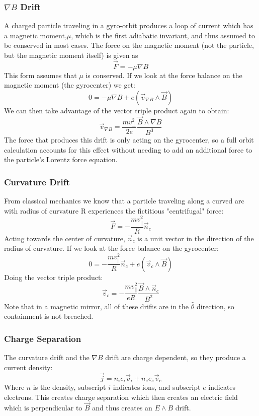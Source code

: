 \documentclass[12pt]{article}
\begin{document}
\subsubsection{$\nabla B$ Drift}
A charged particle traveling in a gyro-orbit produces a loop of current which has a magnetic moment,$\mu$, which is the first adiabatic invariant, and thus assumed to be conserved in most cases. The force on the magnetic moment (not the particle, but the magnetic moment itself) is given as
$$\vec{F}=-\mu\nabla B$$
This form assumes that $\mu$ is conserved. If we look at the force balance on the magnetic moment (the gyrocenter) we get:
$$0=-\mu\nabla B+e(\vec{v}_{\nabla B}\wedge\vec{B})$$
We can then take advantage of the vector triple product again to obtain:
\begin{equation}\label{gradB}
\vec{v}_{\nabla B}=\frac{mv_{\perp}^2}{2e}\frac{\vec{B}\wedge\nabla B}{B^3}
\end{equation}
The force that produces this drift is only acting on the gyrocenter, so a full orbit calculation accounts for this effect without needing to add an additional force to the particle's Lorentz force equation.
\subsubsection{Curvature Drift}
From classical mechanics we know that a particle traveling along a curved arc with radius of curvature R experiences the fictitious "centrifugal" force:
$$\vec{F}=-\frac{mv_{\parallel}^2}{R}\vec{n}_c$$
Acting towards the center of curvature, $\vec{n}_c$ is a unit vector in the direction of the radius of curvature. If we look at the force balance on the gyrocenter:
$$0=-\frac{mv_{\parallel}^2}{R}\vec{n}_c+e(\vec{v}_{c}\wedge\vec{B})$$
Doing the vector triple product:
\begin{equation}\label{Cuvature}
\vec{v}_c=-\frac{mv_{\parallel}^2}{eR}\frac{\vec{B}\wedge\vec{n}_c}{B^2}
\end{equation}
Note that in a magnetic mirror, all of these drifts are in the $\hat{\theta}$ direction, so containment is not breached.
\subsubsection{Charge Separation}
The curvature drift and the $\nabla B$ drift are charge dependent, so they produce a current density:
\begin{equation}\label{current}
\vec{j}=n_ie_i\vec{v}_i+n_ee_e\vec{v}_e
\end{equation}
Where $n$ is the density, subscript $i$ indicates ions, and subscript $e$ indicates electrons. This creates charge separation which then creates an electric field which is perpendicular to $\vec{B}$ and thus creates an $E\wedge B$ drift.
\end{document}

